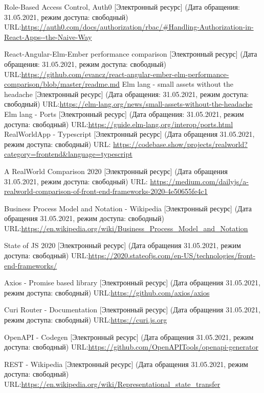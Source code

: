 \documentclass[a4paper,12pt,reqno]{article}
\begin{document}
\begin{thebibliography}{27}
		 Role-Based Access Control, Auth0  [Электронный ресурс] (Дата обращения: 31.05.2021, режим доступа: свободный) URL:\url{https://auth0.com/docs/authorization/rbac/#Handling-Authorization-in-React-Apps--the-Naive-Way}
		
		 React-Angular-Elm-Ember performance comparison [Электронный ресурс] (Дата обращения: 31.05.2021, режим доступа: свободный) URL:\url{https://github.com/evancz/react-angular-ember-elm-performance-comparison/blob/master/readme.md}
		 Elm lang - small assets without the headache [Электронный ресурс] (Дата обращения: 31.05.2021, режим доступа: свободный) URL:\url{https://elm-lang.org/news/small-assets-without-the-headache}
		 Elm lang - Ports [Электронный ресурс] (Дата обращения: 31.05.2021, режим доступа: свободный) URL:\url{https://guide.elm-lang.org/interop/ports.html}
		 RealWorldApp - Typescript [Электронный ресурс] (Дата обращения 31.05.2021, режим доступа: свободный) URL: \url{https://codebase.show/projects/realworld?category=frontend&language=typescript}
		
		 A RealWorld Comparison 2020 [Электронный ресурс] (Дата обращения 31.05.2021, режим доступа: свободный) URL: \url{https://medium.com/dailyjs/a-realworld-comparison-of-front-end-frameworks-2020-4e50655fe4c1}
		
		 Business Process Model and Notation - Wikipedia [Электронный ресурс] (Дата обращения 31.05.2021, режим доступа: свободный) URL:\url{https://en.wikipedia.org/wiki/Business_Process_Model_and_Notation}
		
		 State of JS 2020 [Электронный ресурс] (Дата обращения 31.05.2021, режим доступа: свободный) URL:\url{https://2020.stateofjs.com/en-US/technologies/front-end-frameworks/}
		
		 Axios - Promise based library [Электронный ресурс] (Дата обращения 31.05.2021, режим доступа: свободный) URL:\url{https://github.com/axios/axios}
		
		 Curi Router - Documentation [Электронный ресурс] (Дата обращения 31.05.2021, режим доступа: свободный) URL:\url{https://curi.js.org}
		
		 OpenAPI - Codegen [Электронный ресурс] (Дата обращения 31.05.2021, режим доступа: свободный) URL:\url{https://github.com/OpenAPITools/openapi-generator}
		
		 REST - Wikipedia [Электронный ресурс] (Дата обращения 31.05.2021, режим доступа: свободный) URL:\url{https://en.wikipedia.org/wiki/Representational_state_transfer}
		

\end{thebibliography}
\end{document}
